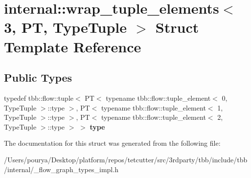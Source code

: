 \hypertarget{structinternal_1_1wrap__tuple__elements_3_013_00_01PT_00_01TypeTuple_01_4}{}\section{internal\+:\+:wrap\+\_\+tuple\+\_\+elements$<$ 3, P\+T, Type\+Tuple $>$ Struct Template Reference}
\label{structinternal_1_1wrap__tuple__elements_3_013_00_01PT_00_01TypeTuple_01_4}
\subsection*{Public Types}
\begin{DoxyCompactItemize}
\item 
\hypertarget{structinternal_1_1wrap__tuple__elements_3_013_00_01PT_00_01TypeTuple_01_4_a6287eb5a6aaf49b49a893616acb338d1}{}typedef tbb\+::flow\+::tuple$<$ P\+T$<$ typename tbb\+::flow\+::tuple\+\_\+element$<$ 0, Type\+Tuple $>$\+::type $>$, P\+T$<$ typename tbb\+::flow\+::tuple\+\_\+element$<$ 1, Type\+Tuple $>$\+::type $>$, P\+T$<$ typename tbb\+::flow\+::tuple\+\_\+element$<$ 2, Type\+Tuple $>$\+::type $>$ $>$ {\bfseries type}\label{structinternal_1_1wrap__tuple__elements_3_013_00_01PT_00_01TypeTuple_01_4_a6287eb5a6aaf49b49a893616acb338d1}

\end{DoxyCompactItemize}


The documentation for this struct was generated from the following file\+:\begin{DoxyCompactItemize}
\item 
/\+Users/pourya/\+Desktop/platform/repos/tetcutter/src/3rdparty/tbb/include/tbb/internal/\+\_\+flow\+\_\+graph\+\_\+types\+\_\+impl.\+h\end{DoxyCompactItemize}
